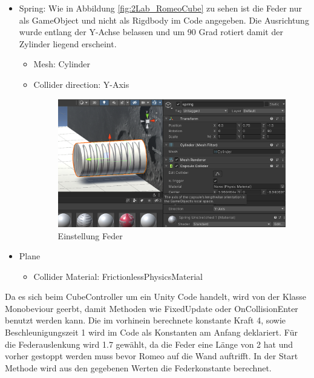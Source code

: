 \documentclass[../main.tex]{subfiles}
\begin{document}
\begin{itemize}
        \item Spring:
        \newline Wie in Abbildung \ref{fig:2Lab_RomeoCube} zu sehen ist die Feder nur als GameObject und nicht als Rigdbody
        im Code angegeben. Die Ausrichtung wurde entlang der Y-Achse belassen und um 90 Grad rotiert damit der Zylinder
        liegend erscheint.
        \begin{itemize}
            \item Mesh: Cylinder
            \item Collider direction: Y-Axis
            \begin{figure}[H]
                \begin{center}
                    \centerline{\includegraphics[width=100mm]{./images/2Lab_Spring.PNG}}
                    \caption{Einstellung Feder}
                    \label{fig:2Lab_Spring}
                \end{center}
            \end{figure}
        \end{itemize}

        \item Plane
        \begin{itemize}
            \item Collider Material: FrictionlessPhysicsMaterial
        \end{itemize}
    \end{itemize}
    Da es sich beim CubeController um ein Unity Code handelt, wird von der Klasse Monobeviour geerbt, damit Methoden wie FixedUpdate oder OnCollisionEnter benutzt werden kann.
    Die im vorhinein berechnete konstante Kraft 4, sowie Beschleunigungszeit 1 wird im Code als Konstanten am Anfang deklariert.
    Für die Federauslenkung wird 1.7 gewählt, da die Feder eine Länge von 2 hat und vorher gestoppt werden muss bevor Romeo auf die Wand auftrifft.
    In der Start Methode wird aus den gegebenen Werten die Federkonstante berechnet.
\end{document}
